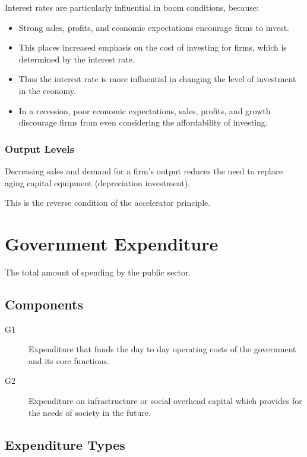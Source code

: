 \documentclass[a4paper,11pt]{article}
\begin{document}
Interest rates are particularly influential in boom conditions, because:

\begin{itemize}
\item Strong sales, profits, and economic expectations encourage firms to
	invest.
\item This places increased emphasis on the cost of investing for firms, which
	is determined by the interest rate.
\item Thus the interest rate is more influential in changing the level of
	investment in the economy.
\item In a recession, poor economic expectations, sales, profits, and growth
	discourage firms from even considering the affordability of investing.
\end{itemize}


\subsubsection{Output Levels}

Decreasing sales and demand for a firm's output reduces the need to replace
aging capital equipment (depreciation investment).

This is the reverse condition of the accelerator principle.




\section{Government Expenditure}

The total amount of spending by the public sector.


\subsection{Components}

\begin{description}
\item [G1] Expenditure that funds the day to day operating costs of the
	government and its core functions.
\item [G2] Expenditure on infrastructure or social overhead capital which
	provides for the needs of society in the future.
\end{description}


\subsection{Expenditure Types}
\end{document}
